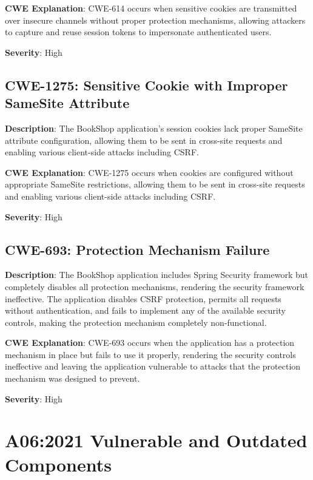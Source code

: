 \documentclass[]{UCD_CS_FYP_Report}
\begin{document}
\textbf{CWE Explanation}: CWE-614 occurs when sensitive cookies are transmitted over insecure channels without proper protection mechanisms, allowing attackers to capture and reuse session tokens to impersonate authenticated users.

\textbf{Severity}: High



\section{CWE-1275: Sensitive Cookie with Improper SameSite Attribute}

\textbf{Description}: The BookShop application's session cookies lack proper SameSite attribute configuration, allowing them to be sent in cross-site requests and enabling various client-side attacks including CSRF.

\textbf{CWE Explanation}: CWE-1275 occurs when cookies are configured without appropriate SameSite restrictions, allowing them to be sent in cross-site requests and enabling various client-side attacks including CSRF.

\textbf{Severity}: High



\section{CWE-693: Protection Mechanism Failure}

\textbf{Description}: The BookShop application includes Spring Security framework but completely disables all protection mechanisms, rendering the security framework ineffective. The application disables CSRF protection, permits all requests without authentication, and fails to implement any of the available security controls, making the protection mechanism completely non-functional.

\textbf{CWE Explanation}: CWE-693 occurs when the application has a protection mechanism in place but fails to use it properly, rendering the security controls ineffective and leaving the application vulnerable to attacks that the protection mechanism was designed to prevent.

\textbf{Severity}: High



\chapter{A06:2021 Vulnerable and Outdated Components}
\end{document}
